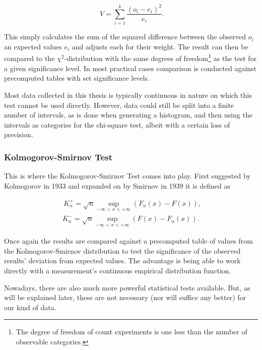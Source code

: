 \begin{equation}
\phantom{.}V=\sum_{i=1}^{k} \frac{(o_i - e_i)^2}{e_i}\text{.}
\end{equation}

This simply calculates the sum of the squared difference between the observed $o_i$ an expected values $e_i$ and adjusts each for their weight. The result can then be compared to the $\chi^2$-distribution with the same degrees of freedom\footnote{The degree of freedom of count experiments is one less than the number of observable categories.} as the test for a given significance level. In most practical cases comparison is conducted against precomputed tables with set significance levels.

Most data collected in this thesis is typically continuous in nature on which this test cannot be used directly. However, data could still be split into a finite number of intervals, as is done when generating a histogram, and then using the intervals as categories for the chi-square test, albeit with a certain loss of precision.

\subsubsection{Kolmogorov-Smirnov Test}

This is where the Kolmogorov-Smirnov Test comes into play. First suggested by Kolmogorov in 1933 \cite{kolmogorov1933sulla} and expanded on by Smirnov in 1939 \cite{smirnov1939estimation} it is defined as

\begin{equation}
	\begin{aligned}
	\phantom{,}K_n^+ = \sqrt{n} \sup_{-\infty < x < + \infty} \left( F_n(x) - F(x) \right), \\
	\phantom{.}K_n^- = \sqrt{n} \sup_{-\infty < x < + \infty} \left( F(x) - F_n(x) \right).
	\end{aligned}
\end{equation}

Once again the results are compared against a precomputed table of values from the Kolmogorov-Smirnov distribution to test the significance of the observed results' deviation from expected values. The advantage is being able to work directly with a measurement's continuous empirical distribution function.

Nowadays, there are also much more powerful statistical tests available. But, as will be explained later, these are not necessary (nor will suffice any better) for our kind of data.


